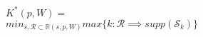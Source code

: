 \documentclass[preview]{standalone}
\begin{document}
\begin{center}
$K^*(p,W) =$\\$ min_{s,\mathcal{R}\subset \mathbb{R}(s,p,W)}max\{k: \mathcal{R} \implies supp(\mathcal{S}_k)\}$
\end{center}
\end{document}
